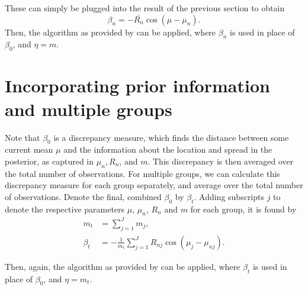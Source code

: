 \documentclass[12pt,a4paper]{article}
\begin{document}
These can simply be plugged into the result of the previous section to obtain
$$\beta_n = - \bar{R_n} \cos \left( \mu - \mu_n \right).$$ Then, the algorithm as provided by \citet{forbes2014fast} can be applied, where $\beta_n$ is used in place of $\beta_0$, and $\eta = m$. 

\section*{Incorporating prior information and multiple groups}

Note that $\beta_0$ is a discrepancy measure, which finds the distance between some current mean $\mu$ and the information about the location and spread in the posterior, as captured in $\mu_n, R_n$, and $m$. This discrepancy is then averaged over the total number of observations. For multiple groups, we can calculate this discrepancy measure for each group separately, and average over the total number of observations. Denote the final, combined $\beta_0$ by $\beta_t$. Adding subscripts $j$ to denote the respective parameters $\mu$, $\mu_n$, $R_n$ and $m$ for each group, it is found by
\begin{align*}
m_t & = \sum_{j=1}^{J} m_j, \\
\beta_t & =  -  \frac{1}{m_t} \sum_{j=1}^{J} R_{nj} \cos (\mu_j - \mu_{nj}).
\end{align*}

Then, again, the algorithm as provided by \citet{forbes2014fast} can be applied, where $\beta_t$ is used in place of $\beta_0$, and $\eta = m_t$. 



\end{document}
